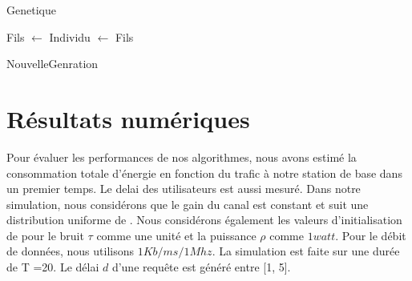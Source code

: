 \documentclass[runningheads]{llncs}
\begin{document}
\begin{algorithm}[H]
    \caption{Genetique}%
    \label{alg:genetic}
    \begin{algorithmic}[1]
                \State Fils $ \gets  $
                \State Individu $\gets $ Fils
                \EndIf{}
            \EndFor{}
        \EndWhile{}

    \State {}
    
    \end{algorithmic}
\end{algorithm}
\begin{algorithm}[H]
    \caption{NouvelleGenration}%
    \label{alg:ngeneration}
    \begin{algorithmic}[1]
    \State {}
    
    \end{algorithmic}
\end{algorithm}



\section{R\'esultats num\'eriques}
Pour évaluer les performances de nos algorithmes, nous avons estimé la 
consommation totale d'énergie en fonction du trafic à notre station de 
base dans un premier temps. Le delai des utilisateurs est aussi mesur\'e.
Dans notre simulation, nous considérons que le gain du canal est constant 
et suit une distribution uniforme de \cite{huang2016}.
Nous considérons également les valeurs d'initialisation de \cite{huang2016} 
pour le bruit $ \tau $ comme une unité et la puissance $ \rho $ comme 
$ 1 watt $. Pour le débit de données, nous utilisons $1Kb/ms/1Mhz$.
La simulation est faite sur une durée de T =20. 
Le délai $d$ d'une requête est généré entre [1, 5].
\end{document}
